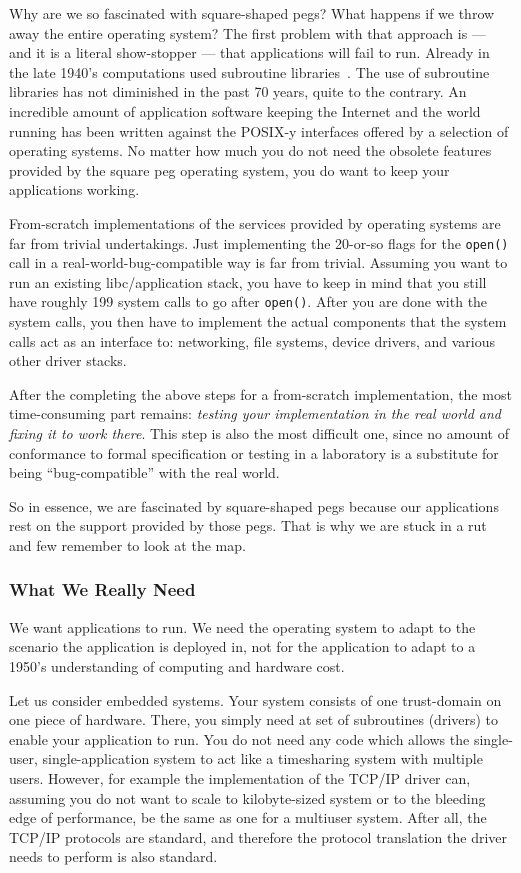 Why are we so fascinated with square-shaped pegs?  What happens if we
throw away the entire operating system?  The first problem with that
approach is --- and it is a literal show-stopper --- that applications will
fail to run.  Already in the late 1940's computations used subroutine
libraries~\cite{campbell-kelly:edsac}.  The use of subroutine libraries
has not diminished in the past 70 years, quite to the contrary.
An incredible amount of application software keeping the Internet and the
world running has been written against the POSIX-y interfaces offered
by a selection of operating systems.  No matter how much you do not
need the obsolete features provided by the square peg operating system,
you do want to keep your applications working.

From-scratch implementations of the services provided by operating systems
are far from trivial undertakings.  Just implementing the 20-or-so flags
for the \texttt{open()} call in a real-world-bug-compatible way is far
from trivial.  Assuming you want to run an existing libc/application
stack, you have to keep in mind that you still have roughly 199 system
calls to go after \texttt{open()}.  After you are done with the system
calls, you then have to implement the actual components that the system
calls act as an interface to: networking, file systems, device drivers,
and various other driver stacks.

After the completing the above steps for a from-scratch implementation,
the most time-consuming part remains: \textit{testing your implementation
in the real world and fixing it to work there}.  This step is also the
most difficult one, since no amount of conformance to formal specification
or testing in a laboratory is a substitute for being ``bug-compatible''
with the real world.

So in essence, we are fascinated by square-shaped pegs because our
applications rest on the support provided by those pegs.  That is why
we are stuck in a rut and few remember to look at the map.


\subsubsection{What We Really Need}

We want applications to run.  We need the operating system to
adapt to the scenario the application is deployed in, not for the
application to adapt to a 1950's understanding of computing and hardware
cost.

Let us consider embedded systems.  Your system consists of one trust-domain on one piece
of hardware.  There, you simply need at set of subroutines (drivers) to
enable your application to run.  You do not need any code which allows
the single-user, single-application system to act like a timesharing
system with multiple users.  However, for example the implementation
of the TCP/IP driver can, assuming you do not want to scale to
kilobyte-sized system or to the bleeding edge of performance, be the
same as one for a multiuser system.  After all, the TCP/IP protocols
are standard, and therefore the protocol translation the driver needs
to perform is also standard.

